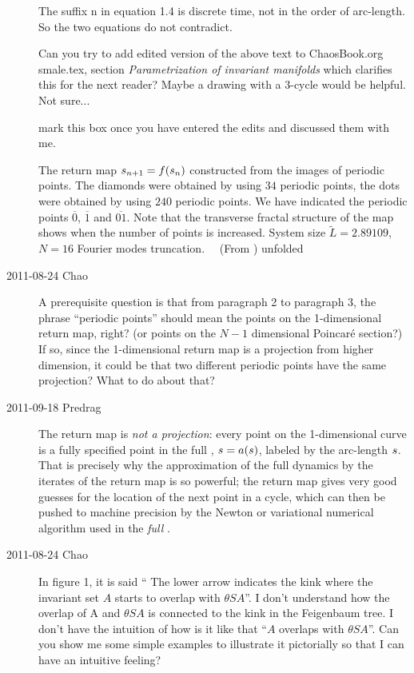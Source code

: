 \begin{description}
The suffix n in equation 1.4 is discrete time, not in the order of arc-length. So the two equations do not contradict.

Can you try to add edited version of the above text to ChaosBook.org
smale.tex, section {\em Parametrization of invariant manifolds} which
clarifies this for the next reader? Maybe a drawing with a 3-cycle would
be helpful. Not sure...

 mark this box once you have entered the
edits and discussed them with me.

{}{
The return map $s_{n+1} = f(s_n)$ constructed from the images of periodic
points. The diamonds were obtained by using $34$ periodic points, the
dots were obtained by using $240$ periodic points. We have indicated the
periodic points $\overline{0}$, $\overline{1}$ and $\overline{01}$. Note
that the transverse fractal structure of the map shows when the number of
points is increased.
System size $ \tilde{L} = 2.89109$, $N=16$ Fourier modes truncation.
~~(From )
}{unfolded}


\item[2011-08-24 Chao]
A prerequisite question is that from paragraph 2 to paragraph 3, the
phrase ``periodic points'' should mean the points on the 1-dimensional
return map, right? (or points on the $N-1$ dimensional Poincar\'e
section?) If so, since the 1-dimensional return map is a projection from
higher dimension, it could be that two different periodic points have the
same projection? What to do about that?

\item[2011-09-18 Predrag]                            \toCB
The return map  is \emph{not a projection}: every point
on the 1-dimensional curve is a fully specified point in the full
\statesp, $s = a(s)$, labeled by the arc-length $s$. That is precisely
why the approximation of the full dynamics by the iterates of the return
map is so powerful; the return map gives very good guesses for the
location of the next point in a cycle, which can then be pushed to
machine precision by the Newton or variational numerical algorithm used
in the \emph{full \statesp}.

\item[2011-08-24 Chao]
In figure 1, it is said `` The lower arrow indicates the kink where the
invariant set $A$ starts to overlap with $\theta SA$''. I don't understand
how the overlap of A and $\theta SA$ is connected to the kink in the
Feigenbaum tree. I don't have the intuition of how is it like that
``$A$ overlaps with $\theta SA$''. Can you show me some simple examples to
illustrate it pictorially so that I can have an intuitive feeling?


\end{description}
